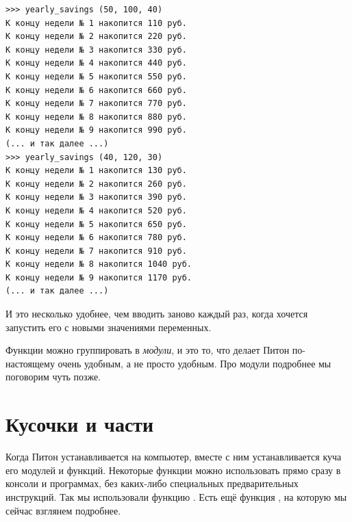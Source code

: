 \begin{listing}
\begin{verbatim}
>>> yearly_savings (50, 100, 40)
К концу недели № 1 накопится 110 руб.
К концу недели № 2 накопится 220 руб.
К концу недели № 3 накопится 330 руб.
К концу недели № 4 накопится 440 руб.
К концу недели № 5 накопится 550 руб.
К концу недели № 6 накопится 660 руб.
К концу недели № 7 накопится 770 руб.
К концу недели № 8 накопится 880 руб.
К концу недели № 9 накопится 990 руб.
(... и так далее ...)
>>> yearly_savings (40, 120, 30)
К концу недели № 1 накопится 130 руб.
К концу недели № 2 накопится 260 руб.
К концу недели № 3 накопится 390 руб.
К концу недели № 4 накопится 520 руб.
К концу недели № 5 накопится 650 руб.
К концу недели № 6 накопится 780 руб.
К концу недели № 7 накопится 910 руб.
К концу недели № 8 накопится 1040 руб.
К концу недели № 9 накопится 1170 руб.
(... и так далее ...)
\end{verbatim}
\end{listing}

И это несколько удобнее, чем вводить заново  каждый раз, когда хочется запустить его с новыми значениями переменных.

Функции можно группировать в \emph{модули}, и это то, что делает Питон по-настоящему очень удобным, а не просто удобным. Про модули подробнее мы поговорим чуть позже.

\section{Кусочки и части}

Когда Питон устанавливается на компьютер, вместе с ним устанавливается куча его модулей и функций. Некоторые функции можно использовать прямо сразу в консоли и программах, без каких-либо специальных предварительных инструкций. Так мы использовали функцию . Есть ещё функция , на которую мы сейчас взглянем подробнее.

